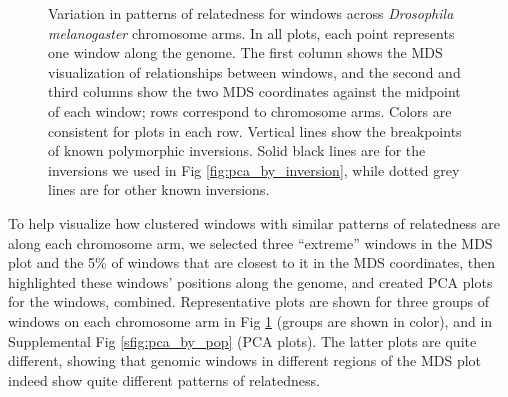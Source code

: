 \documentclass[11pt, oneside]{article}   	%
\newcommand{\Figure}{Fig }
\newcommand{\Figure}{{Figure }}
\begin{document}
\begin{figure}
\begin{center}
       \fi
    \end{center}
    \caption{
        Variation in patterns of relatedness for windows across \textit{Drosophila melanogaster} chromosome arms.
        In all plots, each point represents one window along the genome.
         The first column shows the MDS visualization of relationships between windows, 
         and the second and third columns show 
        the two MDS coordinates
         against the midpoint of each window;
         rows correspond to chromosome arms.
         Colors are consistent for plots in each row. 
         Vertical lines show the breakpoints of known polymorphic inversions.   
         Solid black lines are for the inversions we used in \Figure \ref{fig:pca_by_inversion},
         while dotted grey lines are for other known inversions.     
         \label{fig:mds_allchr}
    }
\end{figure}



To help visualize how clustered windows with similar patterns of relatedness are along each chromosome arm, 
we selected three ``extreme'' windows in the MDS plot
and the 5\% of windows that are closest to it in the MDS coordinates,
then highlighted these windows' positions along the genome,
and created PCA plots for the windows, combined.
Representative plots are shown for three groups of windows on each chromosome arm
in \Figure \ref{fig:mds_allchr} (groups are shown in color),
and in Supplemental \Figure \ref{sfig:pca_by_pop} (PCA plots).
The latter plots are quite different,
showing that genomic windows in different regions of the MDS plot 
indeed show quite different patterns of relatedness.
\end{document}
